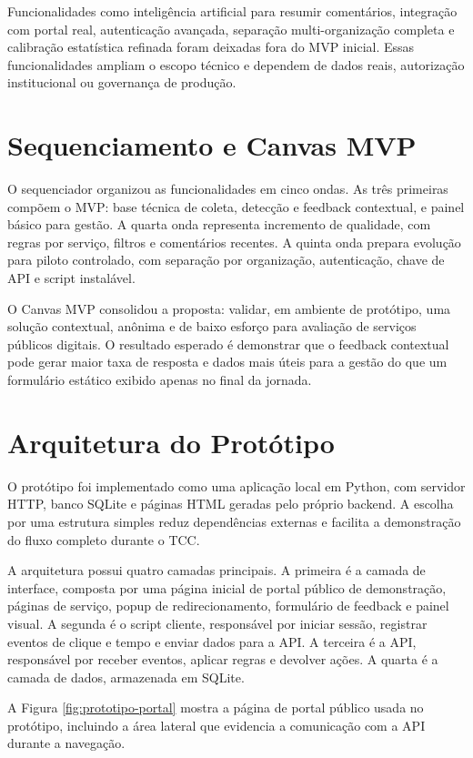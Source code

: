 Funcionalidades como inteligência artificial para resumir comentários, integração
com portal real, autenticação avançada, separação multi-organização completa e
calibração estatística refinada foram deixadas fora do MVP inicial. Essas
funcionalidades ampliam o escopo técnico e dependem de dados reais, autorização
institucional ou governança de produção.

\section{Sequenciamento e Canvas MVP}

O sequenciador organizou as funcionalidades em cinco ondas. As três primeiras
compõem o MVP: base técnica de coleta, detecção e feedback contextual, e painel
básico para gestão. A quarta onda representa incremento de qualidade, com regras
por serviço, filtros e comentários recentes. A quinta onda prepara evolução para
piloto controlado, com separação por organização, autenticação, chave de API e
script instalável.

O Canvas MVP consolidou a proposta: validar, em ambiente de protótipo, uma
solução contextual, anônima e de baixo esforço para avaliação de serviços
públicos digitais. O resultado esperado é demonstrar que o feedback contextual pode gerar
maior taxa de resposta e dados mais úteis para a gestão do que um formulário
estático exibido apenas no final da jornada.

\section{Arquitetura do Protótipo}

O protótipo foi implementado como uma aplicação local em Python, com servidor
HTTP, banco SQLite e páginas HTML geradas pelo próprio backend. A escolha por uma
estrutura simples reduz dependências externas e facilita a demonstração do fluxo
completo durante o TCC.

A arquitetura possui quatro camadas principais. A primeira é a camada de
interface, composta por uma página inicial de portal público de demonstração,
páginas de serviço, popup de redirecionamento, formulário de feedback e painel visual. A
segunda é o script cliente, responsável por iniciar sessão, registrar eventos de
clique e tempo e enviar dados para a API. A terceira é a API, responsável por
receber eventos, aplicar regras e devolver ações. A quarta é a camada de dados,
armazenada em SQLite.

A Figura \ref{fig:prototipo-portal} mostra a página de portal público usada no
protótipo, incluindo a área lateral que evidencia a comunicação com a API durante
a navegação.

